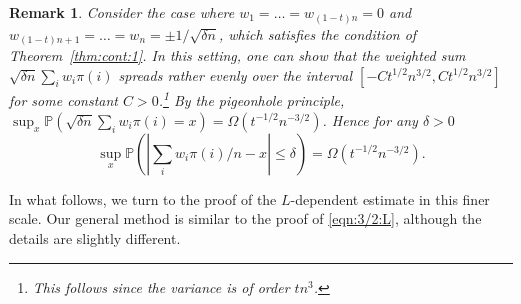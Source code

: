 \documentclass[reqno]{amsart}
\renewcommand\P{{\mathbb{P}}}
\theoremstyle{plain}
\newtheorem{remark}[theorem]{Remark}
\theoremstyle{definition}
\begin{document}
\begin{remark}\label{rmk:optimal:3/2}
Consider the case where $w_1 = \dots = w_{(1-t)n} =0$ and $w_{(1-t)n+1} = \dots = w_n = \pm 1/\sqrt{ \delta n}$, which satisfies the condition of Theorem~\ref{thm:cont:1}. In this setting, one can show that the weighted sum $\sqrt{ \delta n} \sum_{i} w_i \pi(i)$ spreads rather evenly over the interval $[-C t^{1/2} n^{3/2}, Ct^{1/2}n^{3/2}]$ for some constant $C > 0$.\footnote{This follows since the variance is of order $t n^3$.} By the pigeonhole principle, $\sup_{x} \P(\sqrt{\delta n} \sum_{i} w_i \pi(i)=x)= \Omega(t^{-1/2}n^{-3/2})$. Hence for any $\delta>0$
\[
\sup_{x} \P(| \sum_{i} w_i \pi(i)/n-x| \le \delta)  =\Omega(t^{-1/2}n^{-3/2}).
\]
\end{remark}



In what follows, we turn to the proof of the $L$-dependent estimate in this finer scale.  
Our general method is similar to the proof of \eqref{eqn:3/2:L}, although the details are slightly different.
\end{document}
